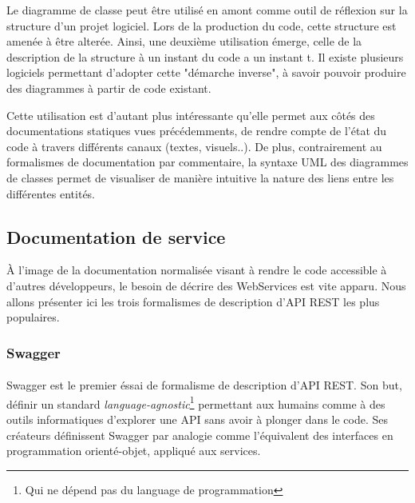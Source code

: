 Le diagramme de classe peut être utilisé en amont comme outil de réflexion sur la structure
d'un projet logiciel. Lors de la production du code, cette structure est amenée à être alterée.
Ainsi, une deuxième utilisation émerge, celle de la description de la structure à un instant du code
a un instant t.
Il existe plusieurs logiciels permettant d'adopter cette "démarche inverse", à savoir pouvoir
produire des diagrammes à partir de code existant.

Cette utilisation est d'autant plus intéressante qu'elle permet aux côtés des documentations
statiques vues précédemments, de rendre compte de l'état du code à travers différents
canaux (textes, visuels..). De plus, contrairement au formalismes de documentation par commentaire,
la syntaxe UML des diagrammes de classes permet de visualiser de manière intuitive la nature des
liens entre les différentes entités.

\newpage
\subsection{Documentation de service}
À l'image de la documentation normalisée visant à rendre le code accessible à d'autres développeurs,
le besoin de décrire des WebServices est vite apparu. Nous allons présenter ici les trois formalismes
de description d'API REST les plus populaires.

    \subsubsection{Swagger}
        \paragraph{}
            Swagger est le premier éssai de formalisme de description d'API REST. Son but, définir un
            standard \textit{language-agnostic}\footnote{Qui ne dépend pas du language de programmation}
            permettant aux humains comme à des outils informatiques d'explorer une API sans avoir à
            plonger dans le code. \label{swaggerdef} Ses créateurs définissent Swagger\cite{Swagger} par analogie comme
            l'équivalent des interfaces en programmation orienté-objet, appliqué aux services.


